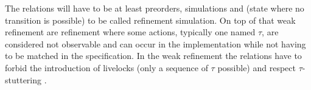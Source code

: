 \documentclass{article}
\begin{document}
The relations will have to be at least preorders, simulations and  (state where no transition is possible) to be called refinement simulation.
On top of that weak refinement are refinement where some actions, typically one named \(\tau\), are considered not observable and can occur in the implementation while not having to be matched in the specification.
In the weak refinement the relations have to forbid the introduction of livelocks (only a sequence of \(\tau\) possible) and respect \(\tau\)-stuttering .
\end{document}
